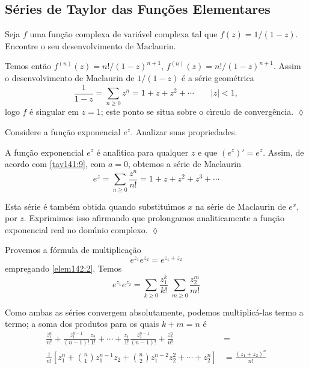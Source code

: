 \subsection{S\'{e}ries de Taylor das Fun\c{c}\~{o}es Elementares}

\begin{exer} Seja $f$ uma fun\c{c}\~{a}o complexa de vari\'{a}vel complexa  tal que
$f(z) = 1/(1-z)$. Encontre o seu desenvolvimento de Maclaurin.
\end{exer}

\solo Temos ent\~{a}o $f^{(n)}(z) =n! /(1 - z)^{n+1}$,
$f^{(n)}(z)=n!/(1-z)^{n+1}$. Assim o desenvolvimento de Maclaurin
de $1/(1 - z)$ \'{e} a s\'{e}rie geom\'{e}trica
\begin{equation}\label{elem142:1}
\frac{1}{1-z}=\sum_{n\geq 0}z^n=1 + z + z^2 +\cdots \qquad  |z|
<1,
\end{equation}
logo $f$ \'{e} singular em $z=1$;  este ponto se situa sobre o c\'{\i}rculo
de converg\^{e}ncia. \hfill \(\lozenge\)


\begin{exer}
Considere a fun\c{c}\~{a}o exponencial $e^z$. Analizar suas propriedades.
\end{exer}

\solo  A fun\c{c}\~{a}o exponencial $e^z$
 \'{e} anal\'{\i}tica para qualquer $z$ e que $(e^z)'=e^z$.
Assim, de acordo com \eqref{tay141:9}, com $a = 0$, obtemos a
s\'{e}rie de Maclaurin
\begin{equation}\label{elem142:2}
 e^z =\sum_{n\geq 0}\frac{z^n}{n!}=1+z+z^2+z^3+\cdots
\end{equation}

Esta s\'{e}rie \'{e} tamb\'{e}m obtida quando substitu\'{\i}mos $x$ na s\'{e}rie de
Maclaurin de $e^x$, por $z$. Exprimimos isso afirmando que
prolongamos analiticamente a fun\c{c}\~{a}o exponencial real no dom\'{\i}nio
complexo. \hfill \(\lozenge\)

\bigskip
Provemos a f\'{o}rmula de multiplica\c{c}\~{a}o
\begin{equation}\label{elem142:3}
e^{z_1}e^{z_2}=e^{z_1+z_2}
\end{equation}
empregando \eqref{elem142:2}. Temos
\begin{equation*}
e^{z_1}e^{z_2}=\sum_{k\geq 0}\frac{z_1^k}{k!}\;\sum_{m\geq
0}\frac{z_2^m}{m!}
\end{equation*}

Como ambas as s\'{e}ries convergem absolutamente, podemos
multiplic\'{a}-las termo a termo; a soma dos produtos para os quais $k
+ m= n$ \'{e}
\begin{align*}
\frac{z_1^n}{n!}+\frac{z_1^{n-1}}{(n-1)!}\frac{z_2}{1!}+\cdots+
\frac{z_1}{1!}\frac{z_2^{n-1}}{(n-1)!}+\frac{z_2^n}{n!}&=\\[2ex]
\frac{1}{n!}\left[z_1^n+{n\choose 1}z_1^{n-1}z_2+{n\choose
2}z_1^{n-2}z_2^2+\cdots+z_2^n \right]&=\frac{(z_1+z_2)^n}{n!}
\end{align*}


